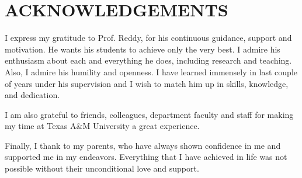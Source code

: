 %
%
%


\chapter*{ACKNOWLEDGEMENTS}


\indent I express my gratitude to Prof. Reddy, for his continuous guidance, support and motivation. He wants his students to achieve only the very best. I admire his enthusiasm about each and everything he does, including research and teaching. Also, I admire his humility and openness. I have learned immensely in last couple of years under his supervision and I wish to match him up in skills, knowledge, and dedication.  


I am also grateful to friends, colleagues, department faculty and staff for making my time at Texas A\&M University a great experience.

Finally, I thank to my parents, who have always shown confidence in me and supported me in my endeavors. Everything that I have achieved in life was not possible without their unconditional love and support.

\pagebreak{}
